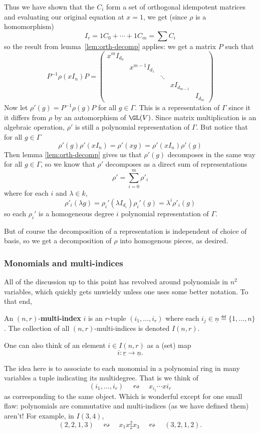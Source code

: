 \documentclass[12pt]{article}
\begin{document}
\begin{prf}
	Thus we have shown that the $C_i$ form a set of orthogonal idempotent matrices and evaluating our original equation at $x=1$,
	we get (since $\rho$ is a homomorphism)
	\[I_r=1C_0+\cdots+1C_m=\sum C_i\]
	so the result from lemma~\ref{lem:orth-decomp} applies: we get a matrix $P$ such that 
	\[P^{-1}\rho(xI_n)P=\begin{pmatrix}
		x^mI_{d_0} & & & &\\
		& x^{m-1}I_{d_1} & & &\\
		& & \ddots & &\\
		& & & xI_{d_{m-1}} & \\
		& & & & I_{d_m}
	\end{pmatrix}\]
	Now let $\rho'(g)=P^{-1}\rho (g)P$ for all $g\in\Gamma$. This is a representation of $\Gamma$ since it it differs from $\rho$ by 
	an automorphism of $\GL(V)$. Since matrix multiplication is an algebraic operation, $\rho'$ is still a polynomial representation of $\Gamma$. 
	But notice that for all $g\in\Gamma$
	\[\rho'(g)\rho'(xI_n)=\rho'(xg)=\rho'(xI_n)\rho'(g)\]
	Then lemma \ref{lem:orth-decomp} gives us that $\rho'(g)$ decomposes in the same way for all $g\in \Gamma$, so 
	we know that $\rho'$ decomposes as a direct sum of representations 
	\[\rho'=\sum_{i=0}^m \rho'_i\]
	where for each $i$ and $\lambda\in k$,
	\[\rho'_i(\lambda g)=\rho_i'(\lambda I_{d_i})\rho_i'(g)=\lambda^i\rho'_i(g)\]
	so each $\rho_i'$ is a homogeneous degree $i$ polynomial representation of $\Gamma$.

	But of course the decomposition of a representation is independent of choice of basis,
	so we get a decomposition of $\rho$ into homogenous pieces, as desired.
\end{prf}

\subsubsection{Monomials and multi-indices}\label{subsubsec:indices}
All of the discussion up to this point has revolved around polynomials in $n^2$ variables, which quickly gets unwieldy unless one 
uses some better notation. To that end, 
\begin{defn}
	An $(n,r)$-\textbf{multi-index} $i$ is an $r$-tuple $(i_1,\dots,i_r)$ where each $i_j\in\underline n\eqdef\{1,\dots,n\}$.
	The collection of all $(n,r)$-multi-indices is denoted $I(n,r)$.
\end{defn}
\begin{rmk}
	One can also think of an element $i\in I(n,r)$ as a (set) map 
	\[i:\underline r\to\underline n.\]
\end{rmk}
The idea here is to associate to each monomial in a polynomial ring in many variables a tuple indicating its multidegree. That is we think of 
\[(i_1,\dots,i_r)\quad\leftrightsquigarrow\quad x_{i_1}\cdots x{i_r}\]
as corresponding to the same object. Which is wonderful except for one small flaw: polynomials are commutative 
and multi-indices (as we have defined them) aren't! For example, in $I(3,4)$,
\[(2,2,1,3)\quad\leftrightsquigarrow\quad x_1x_2^2x_3\quad\leftrightsquigarrow\quad (3,2,1,2).\]
\end{document}
